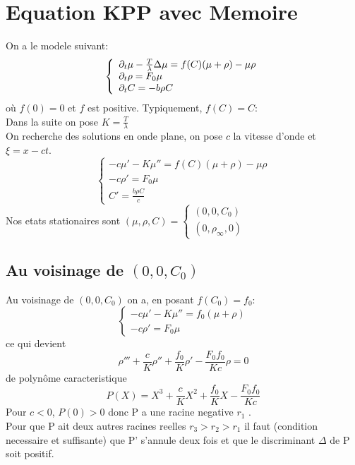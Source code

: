 \section{Equation KPP avec Memoire}
On a le modele suivant: 
\begin{equation} \left\{
                \begin{array}{ll}
                   \partial_t\mu -\frac{T}{\lambda}\Delta\mu = f(C)(\mu + \rho) -\mu\rho\\
                 \partial_t\rho=  F_0 \mu \\
                  \partial_t C = -b\rho C
                \end{array}
              \right.
\end{equation} 
où $f(0)=0$ et $f$ est positive. Typiquement, $f(C)=C$:\\
Dans la suite on pose $K= \frac{T}{\lambda}$\\
On recherche des solutions en onde plane, on pose $c$ la vitesse d'onde et $\xi = x - ct$. \\
\begin{equation} \left\{ \begin{array}{ll} -c \mu'-K\mu''=f(C)(\mu+\rho)-\mu\rho \\ -c\rho' = F_0\mu  \\C'=\frac{b\rho C}{c} \end{array}\right.
\end{equation}
Nos etats stationaires sont $(\mu,\rho,C) = \left\{ \begin{array}{ll} (0,0,C_0) \\
 (0,\rho_\infty,0) \end{array} \right.$ 
\subsection{Au voisinage de $(0,0,C_0)$}
Au voisinage de $(0,0,C_0)$ on a, en posant $f(C_0)=f_0$:
\begin{equation} \left\{ \begin{array}{ll} -c \mu'-K\mu''=f_0(\mu+\rho) \\ -c\rho' = F_0\mu   \end{array}\right.
\end{equation} ce qui devient  \begin{equation} \rho''' +\frac{c}{K}\rho''+\frac{f_0}{K}\rho'-\frac{F_0f_0}{Kc}\rho =0 \end{equation} de polynôme caracteristique \begin{equation} P(X)= X^3 +\frac{c}{K}X^2+\frac{f_0}{K}X-\frac{F_0f_0}{Kc} \end{equation}
Pour $c<0$,   $P(0)>0$ donc P a une racine negative $r_1$ .\\
Pour que P ait deux autres racines reelles $r_3>r_2>r_1$ il faut (condition necessaire et suffisante) que P' s'annule deux fois et que le discriminant $\Delta$ de P soit positif.
